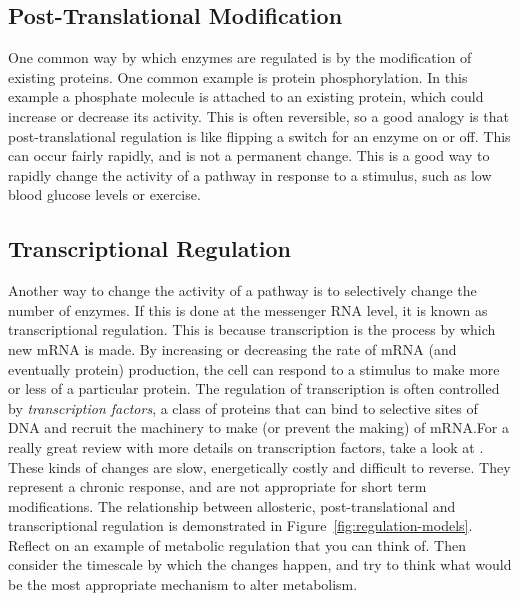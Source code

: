 \documentclass{tufte-handout}
\begin{document}
\subsection{Post-Translational Modification}

One common way by which enzymes are regulated is by the modification of existing proteins.  One common example is protein phosphorylation.  In this example a phosphate molecule is attached to an existing protein, which could increase or decrease its activity.  This is often reversible, so a good analogy is that post-translational regulation is like flipping a switch for an enzyme on or off.  This can occur fairly rapidly, and is not a permanent change.  This is a good way to rapidly change the activity of a pathway in response to a stimulus, such as low blood glucose levels or exercise.

\subsection{Transcriptional Regulation}

Another way to change the activity of a pathway is to selectively change the number of enzymes.  If this is done at the messenger RNA level, it is known as transcriptional regulation.  This is because transcription is the process by which new mRNA is made.  By increasing or decreasing the rate of mRNA (and eventually protein) production, the cell can respond to a stimulus to make more or less of a particular protein.  The regulation of transcription is often controlled by \emph{transcription factors}, a class of proteins that can bind to selective sites of DNA and recruit the machinery to make (or prevent the making) of mRNA.\@  For a really great review with more details on transcription factors, take a look at \citet{Lambert2018}.  These kinds of changes are slow, energetically costly and difficult to reverse.  They represent a chronic response, and are not appropriate for short term modifications.  The relationship between allosteric, post-translational and transcriptional regulation is demonstrated in Figure~\ref{fig:regulation-models}.  Reflect on an example of metabolic regulation that you can think of.  Then consider the timescale by which the changes happen, and try to think what would be the most appropriate mechanism to alter metabolism.
\end{document}
